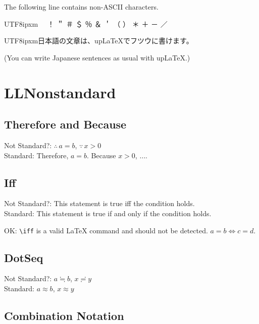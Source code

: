 \documentclass[a4paper]{article}
\begin{document}
The following line contains non-ASCII characters.

\begin{CJK}{UTF8}{ipxm}{　} ！ ＂ ＃ ＄ ％ ＆ ＇ （ ） ＊ ＋ － ／\end{CJK}

\vspace{\baselineskip}

\begin{CJK}{UTF8}{ipxm}日本語の文章は、upLaTeXでフツウに書けます。\end{CJK}

(You can write Japanese sentences as usual with upLaTeX.)

\section{LLNonstandard}

\subsection{Therefore and Because}

Not Standard?: \(\therefore \, a = b\), \(\because \, x > 0\)\\
Standard: Therefore, \(a = b\). Because \(x > 0\), \(\ldots\).


\subsection{Iff}

Not Standard?: This statement is true iff the condition holds.\\
Standard: This statement is true if and only if the condition holds.

OK: \verb|\iff| is a valid LaTeX command and should not be detected.
\(a = b \iff c = d\).

\subsection{DotSeq}

Not Standard?: \(a \fallingdotseq b\), \(x \risingdotseq y\)\\
Standard: \(a \approx b\), \(x \approx y\)

\subsection{Combination Notation}
\end{document}
